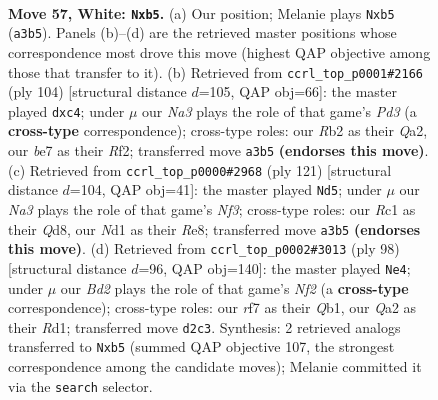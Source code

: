 \documentclass[11pt]{article}
\begin{document}
\clearpage

\begin{figure}[p]\centering
\begin{subfigure}{0.46\textwidth}\centering
\resizebox{\linewidth}{!}{%
\newchessgame
\chessboard[
  setfen={nr4k1/3qbr2/4n3/Ppp2p1p/3p1Pp1/N5P1/QR1BP2P/2RN2K1 w - - 0 57},
  showmover=false,
  pgfstyle=straightmove, color=movearrow, markmove={a3-b5}
]}
\caption{}
\end{subfigure}\hfill
\begin{subfigure}{0.46\textwidth}\centering
\resizebox{\linewidth}{!}{%
\newchessgame
\chessboard[
  setfen={7k/2r3b1/pn2q1pp/Np2p3/1BppP2P/P2P2P1/Q2N1RK1/8 w - - 24 53},
  showmover=false,
  pgfstyle=straightmove, color=movearrow, markmove={d3-c4}
]}
\caption{}
\end{subfigure}
\\[4pt]
\begin{subfigure}{0.46\textwidth}\centering
\resizebox{\linewidth}{!}{%
\newchessgame
\chessboard[
  setfen={3qr1k1/1p3pb1/1Pp1pnn1/2P5/2BP1PP1/7Q/4N3/r1BR1R1K b - - 10 61},
  showmover=false,
  pgfstyle=straightmove, color=movearrow, markmove={f6-d5}
]}
\caption{}
\end{subfigure}\hfill
\begin{subfigure}{0.46\textwidth}\centering
\resizebox{\linewidth}{!}{%
\newchessgame
\chessboard[
  setfen={4r1k1/2br2p1/p1q2p1p/1p1np3/1P6/2P2PBP/1P3NP1/1Q1RR2K w - - 26 50},
  showmover=false,
  pgfstyle=straightmove, color=movearrow, markmove={f2-e4}
]}
\caption{}
\end{subfigure}
\caption{\textbf{Move 57, White: \texttt{Nxb5}.} (a) Our position; Melanie plays \texttt{Nxb5} (\texttt{a3b5}). Panels (b)--(d) are the retrieved master positions whose correspondence most drove this move (highest QAP objective among those that transfer to it). (b) Retrieved from \texttt{ccrl\_top\_p0001\#2166} (ply 104) [structural distance $d$=105, QAP obj=66]: the master played \texttt{dxc4}; under $\mu$ our \emph{Na3} plays the role of that game's \emph{Pd3} (a \textbf{cross-type} correspondence); cross-type roles: our \emph{R}b2 as their \emph{Q}a2, our \emph{b}e7 as their \emph{R}f2; transferred move \texttt{a3b5} \textbf{(endorses this move)}. (c) Retrieved from \texttt{ccrl\_top\_p0000\#2968} (ply 121) [structural distance $d$=104, QAP obj=41]: the master played \texttt{Nd5}; under $\mu$ our \emph{Na3} plays the role of that game's \emph{Nf3}; cross-type roles: our \emph{R}c1 as their \emph{Q}d8, our \emph{N}d1 as their \emph{R}e8; transferred move \texttt{a3b5} \textbf{(endorses this move)}. (d) Retrieved from \texttt{ccrl\_top\_p0002\#3013} (ply 98) [structural distance $d$=96, QAP obj=140]: the master played \texttt{Ne4}; under $\mu$ our \emph{Bd2} plays the role of that game's \emph{Nf2} (a \textbf{cross-type} correspondence); cross-type roles: our \emph{r}f7 as their \emph{Q}b1, our \emph{Q}a2 as their \emph{R}d1; transferred move \texttt{d2c3}. Synthesis: 2 retrieved analogs transferred to \texttt{Nxb5} (summed QAP objective 107, the strongest correspondence among the candidate moves); Melanie committed it via the \texttt{search} selector.}
\label{fig:thought-m112}
\end{figure}
\end{document}
